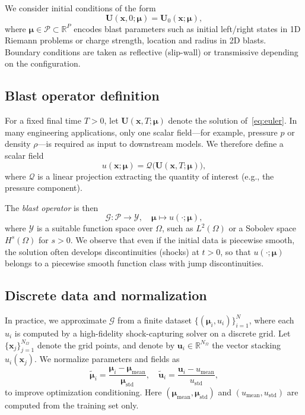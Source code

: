 \documentclass[a4paper,fleqn]{cas-dc}
\begin{document}
We consider initial conditions of the form
\begin{equation}
  \mathbf{U}(\mathbf{x},0;\boldsymbol{\mu}) = \mathbf{U}_0(\mathbf{x};\boldsymbol{\mu}),
\end{equation}
where $\boldsymbol{\mu} \in \mathcal{P} \subset \mathbb{R}^P$ encodes blast parameters such as initial left/right states in 1D Riemann problems or charge strength, location and radius in 2D blasts.
Boundary conditions are taken as reflective (slip-wall) or transmissive depending on the configuration.

\subsection{Blast operator definition}

For a fixed final time $T>0$, let $\mathbf{U}(\mathbf{x},T;\boldsymbol{\mu})$ denote the solution of~\eqref{eq:euler}.
In many engineering applications, only one scalar field---for example, pressure $p$ or density $\rho$---is required as input to downstream models.
We therefore define a scalar field
\begin{equation}
  u(\mathbf{x};\boldsymbol{\mu}) = \mathcal{Q}\big(\mathbf{U}(\mathbf{x},T;\boldsymbol{\mu})\big),
\end{equation}
where $\mathcal{Q}$ is a linear projection extracting the quantity of interest (e.g., the pressure component).

The \emph{blast operator} is then
\begin{equation}
  \mathcal{G}: \mathcal{P} \to \mathcal{Y}, \quad
  \boldsymbol{\mu} \mapsto u(\cdot;\boldsymbol{\mu}),
\end{equation}
where $\mathcal{Y}$ is a suitable function space over $\Omega$, such as $L^2(\Omega)$ or a Sobolev space $H^s(\Omega)$ for $s>0$.
We observe that even if the initial data is piecewise smooth, the solution often develops discontinuities (shocks) at $t>0$, so that $u(\cdot;\boldsymbol{\mu})$ belongs to a piecewise smooth function class with jump discontinuities.

\subsection{Discrete data and normalization}

In practice, we approximate $\mathcal{G}$ from a finite dataset $\{ (\boldsymbol{\mu}_i,u_i) \}_{i=1}^N$, where each $u_i$ is computed by a high-fidelity shock-capturing solver on a discrete grid.
Let $\{\mathbf{x}_j\}_{j=1}^{N_\Omega}$ denote the grid points, and denote by $\mathbf{u}_i \in \mathbb{R}^{N_\Omega}$ the vector stacking $u_i(\mathbf{x}_j)$.
We normalize parameters and fields as
\begin{equation}
  \tilde{\boldsymbol{\mu}}_i
  = \frac{\boldsymbol{\mu}_i - \boldsymbol{\mu}_\mathrm{mean}}{\boldsymbol{\mu}_\mathrm{std}},
  \quad
  \tilde{\mathbf{u}}_i
  = \frac{\mathbf{u}_i - u_\mathrm{mean}}{u_\mathrm{std}},
\end{equation}
to improve optimization conditioning.
Here $(\boldsymbol{\mu}_\mathrm{mean}, \boldsymbol{\mu}_\mathrm{std})$ and $(u_\mathrm{mean},u_\mathrm{std})$ are computed from the training set only.
\end{document}
